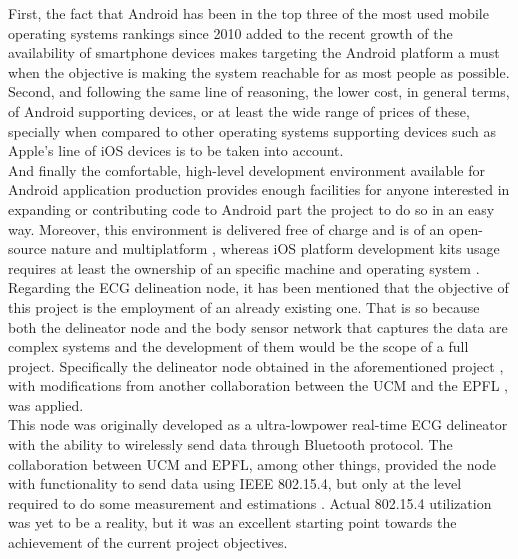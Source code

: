 		First, the fact that Android has been in the top three of the most used mobile operating systems rankings since 2010 \cite{androidSpread} added to the recent growth of the availability of smartphone devices \cite{sphoneStudy} makes targeting the Android platform a must when the objective is making the system reachable for as most people as possible.\\

		Second, and following the same line of reasoning, the lower cost, in general terms, of Android supporting devices, or at least the wide range of prices of these, specially when compared to other operating systems supporting devices such as Apple's line of iOS devices is to be taken into account.\\

		And finally the comfortable, high-level development environment available for Android application production \cite{andDev-what} provides enough facilities for anyone interested in expanding or contributing code to Android part the project to do so in an easy way. Moreover, this environment is delivered free of charge and is of an open-source nature and multiplatform \cite{andDev-sdk}, whereas iOS platform development kits usage requires at least the ownership of an specific machine and operating system \cite{iosDev}.\\

		Regarding the ECG delineation node, it has been mentioned that the objective of this project is the employment of an already existing one. That is so because both the delineator node and the body sensor network that captures the data are complex systems and the development of them would be the scope of a full project. Specifically the delineator node obtained in the aforementioned project \cite{ESL}, with modifications from another collaboration between the UCM and the EPFL \cite{ecg.del.paper}, was applied.\\

		This node was originally developed as a ultra-lowpower real-time ECG delineator with the ability to wirelessly send data through Bluetooth protocol. The collaboration between UCM and EPFL, among other things, provided the node with functionality to send data using IEEE 802.15.4, but only at the level required to do some measurement and estimations \cite{ecg.del.paper}. Actual 802.15.4 utilization was yet to be a reality, but it was an excellent starting point towards the achievement of the current project objectives.\\

